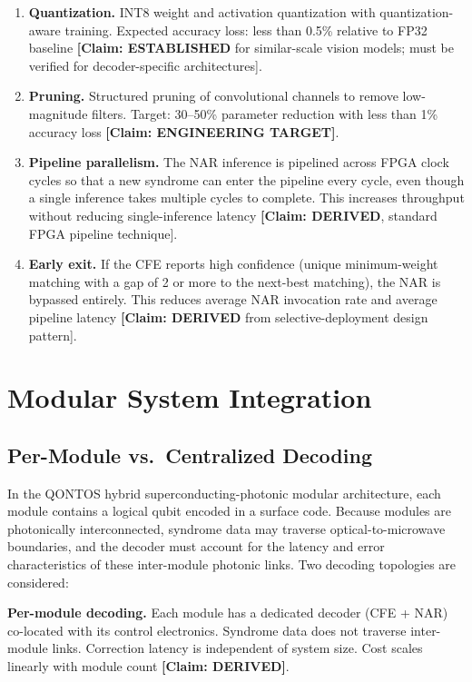 \documentclass[conference]{IEEEtran}
\begin{document}
\begin{enumerate}
\item \textbf{Quantization.} INT8 weight and activation quantization with quantization-aware training. Expected accuracy loss: less than 0.5\% relative to FP32 baseline \textbf{[Claim: ESTABLISHED} for similar-scale vision models; must be verified for decoder-specific architectures].

\item \textbf{Pruning.} Structured pruning of convolutional channels to remove low-magnitude filters. Target: 30--50\% parameter reduction with less than 1\% accuracy loss \textbf{[Claim: ENGINEERING TARGET]}.

\item \textbf{Pipeline parallelism.} The NAR inference is pipelined across FPGA clock cycles so that a new syndrome can enter the pipeline every cycle, even though a single inference takes multiple cycles to complete. This increases throughput without reducing single-inference latency \textbf{[Claim: DERIVED}, standard FPGA pipeline technique].

\item \textbf{Early exit.} If the CFE reports high confidence (unique minimum-weight matching with a gap of 2 or more to the next-best matching), the NAR is bypassed entirely. This reduces average NAR invocation rate and average pipeline latency \textbf{[Claim: DERIVED} from selective-deployment design pattern].
\end{enumerate}

\section{Modular System Integration}

\subsection{Per-Module vs.\ Centralized Decoding}

In the QONTOS hybrid superconducting-photonic modular architecture, each module contains a logical qubit encoded in a surface code. Because modules are photonically interconnected, syndrome data may traverse optical-to-microwave boundaries, and the decoder must account for the latency and error characteristics of these inter-module photonic links. Two decoding topologies are considered:

\textbf{Per-module decoding.} Each module has a dedicated decoder (CFE + NAR) co-located with its control electronics. Syndrome data does not traverse inter-module links. Correction latency is independent of system size. Cost scales linearly with module count \textbf{[Claim: DERIVED]}.
\end{document}
